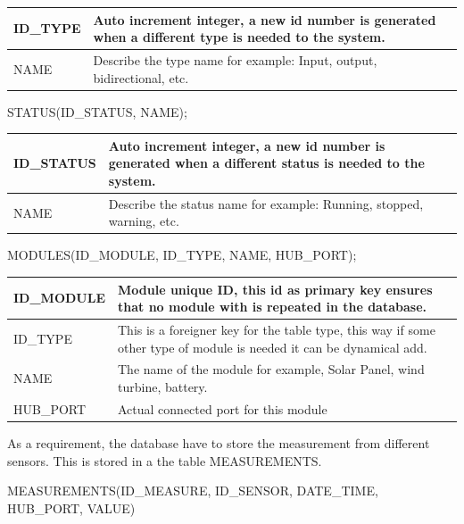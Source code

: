 \begin{table}[H]
\centering
	\begin{tabular}{| p{2cm} | p{10cm} |}
		\hline
		ID\_TYPE & Auto increment integer, a new id number is generated when a different type is needed to the system. \\\hline
		NAME & Describe the type name for example: Input, output, bidirectional, etc.\\\hline
	\end{tabular}
\end{table}

STATUS(ID\_STATUS, NAME);

\begin{table}[H]
\centering
	\begin{tabular}{| p{2cm} | p{10cm} |}
		\hline
		ID\_STATUS & Auto increment integer, a new id number is generated when a different status is needed to the system. \\\hline
		NAME & Describe the status name for example: Running, stopped, warning, etc.\\\hline
	\end{tabular}
\end{table}


MODULES(ID\_MODULE, ID\_TYPE, NAME, HUB\_PORT);

\begin{table}[H]
\centering
	\begin{tabular}{| p{2cm} | p{10cm} |}
		\hline
		ID\_MODULE &  Module unique ID, this id as primary key ensures that no module with is repeated in the database.\\\hline
		ID\_TYPE & This is a foreigner key for the table type, this way if some other type of module is needed it can be dynamical add. \\\hline
		NAME & The name of the module for example, Solar Panel, wind turbine, battery. \\\hline
		HUB\_PORT & Actual connected port for this module\\\hline
	\end{tabular}
\end{table}

As a requirement, the database have to store the measurement  from different sensors. This is stored in a the table MEASUREMENTS.

MEASUREMENTS(ID\_MEASURE, ID\_SENSOR, DATE\_TIME, HUB\_PORT, VALUE)

